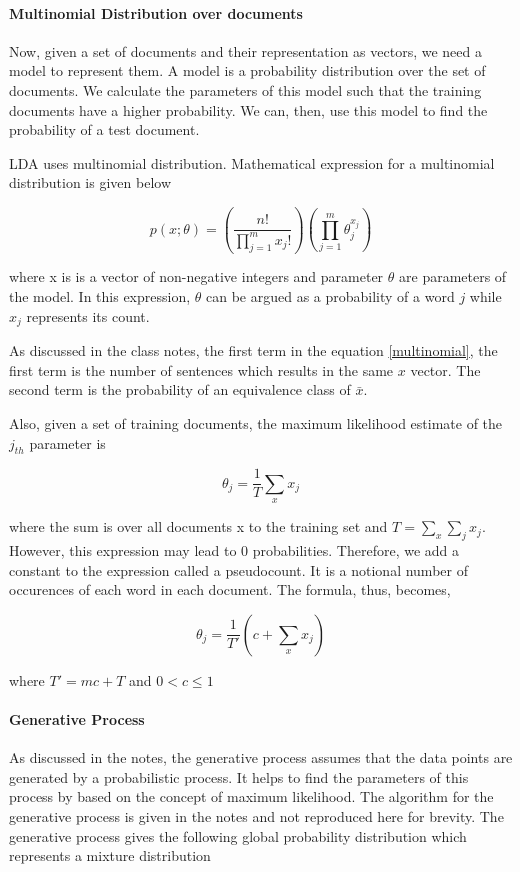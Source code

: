 \documentclass[11pt,a4paper,oneside]{article}
\begin{document}
\paragraph{Multinomial Distribution over documents}
Now, given a set of documents and their representation as vectors, we need a model to represent them. A model is a probability distribution over the set of documents. We calculate the parameters of this model such that the training documents have a higher probability. We can, then, use this model to find the probability of a test document.

LDA uses multinomial distribution. Mathematical expression for a multinomial distribution is given below

\begin{equation}\label{multinomial}
p(x;\theta) = (\frac{n!}{\prod^m_{j=1}x_j!})(\prod^m_{j=1}\theta^{x_j}_j)
\end{equation}

where x is is a vector of non-negative integers and parameter $\theta$ are parameters of the model. In this expression, $\theta$ can be argued as a probability of a word $j$ while $x_j$ represents its count.

As discussed in the class notes, the first term in the equation \ref{multinomial}, the first term is the number of sentences which results in the same $x$ vector. The second term is the probability of an equivalence class of $\bar{x}$.

Also, given a set of training documents, the maximum likelihood estimate of the $j_{th}$ parameter is

\begin{equation}
\theta_j = \frac{1}{T} \sum_x x_j
\end{equation}

where the sum is over all documents x to the training set and $T = \sum_x{\sum_j{x_j}} $. However, this expression may lead to $0$ probabilities. Therefore, we add a constant to the expression called a pseudocount. It is a notional number of occurences of each word in each document. The formula, thus, becomes,

\begin{equation}
\theta_j = \frac{1}{T'} (c + \sum_x x_j)
\end{equation}

where $T' = mc + T$ and $0 < c \leq 1 $

\paragraph{Generative Process}
As discussed in the notes, the generative process assumes that the data points are generated by a probabilistic process. It helps to find the parameters of this process by based on the concept of maximum likelihood. The algorithm for the generative process is given in the notes\cite{classNotes} and not reproduced here for brevity. The generative process gives the following global probability distribution which represents a mixture distribution
\end{document}
